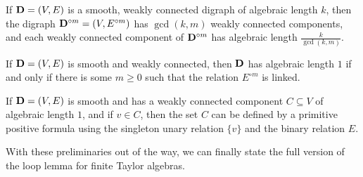 \documentclass[letterpaper,11pt]{article}
\begin{document}
\begin{prop} If $\mathbf{D} = (V,E)$ is a smooth, weakly connected digraph of algebraic length $k$, then the digraph $\mathbf{D}^{\circ m} = (V,E^{\circ m})$ has $\gcd(k,m)$ weakly connected components, and each weakly connected component of $\mathbf{D}^{\circ m}$ has algebraic length $\frac{k}{\gcd(k,m)}$.
\end{prop}

\begin{prop} If $\mathbf{D} = (V,E)$ is smooth and weakly connected, then $\mathbf{D}$ has algebraic length $1$ if and only if there is some $m \ge 0$ such that the relation $E^{\circ m}$ is linked.
\end{prop}

\begin{cor} If $\mathbf{D} = (V,E)$ is smooth and has a weakly connected component $C \subseteq V$ of algebraic length $1$, and if $v \in C$, then the set $C$ can be defined by a primitive positive formula using the singleton unary relation $\{v\}$ and the binary relation $E$.
\end{cor}

With these preliminaries out of the way, we can finally state the full version of the loop lemma for finite Taylor algebras.
\end{document}
